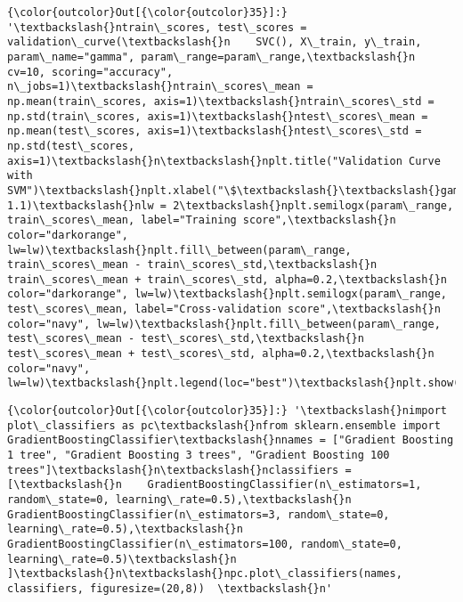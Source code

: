\documentclass[11pt]{article}
\begin{document}
\begin{Verbatim}[commandchars=\\\{\}]
{\color{outcolor}Out[{\color{outcolor}35}]:} '\textbackslash{}ntrain\_scores, test\_scores = validation\_curve(\textbackslash{}n    SVC(), X\_train, y\_train, param\_name="gamma", param\_range=param\_range,\textbackslash{}n    cv=10, scoring="accuracy", n\_jobs=1)\textbackslash{}ntrain\_scores\_mean = np.mean(train\_scores, axis=1)\textbackslash{}ntrain\_scores\_std = np.std(train\_scores, axis=1)\textbackslash{}ntest\_scores\_mean = np.mean(test\_scores, axis=1)\textbackslash{}ntest\_scores\_std = np.std(test\_scores, axis=1)\textbackslash{}n\textbackslash{}nplt.title("Validation Curve with SVM")\textbackslash{}nplt.xlabel("\$\textbackslash{}\textbackslash{}gamma\$")\textbackslash{}nplt.ylabel("Score")\textbackslash{}nplt.ylim(0.0, 1.1)\textbackslash{}nlw = 2\textbackslash{}nplt.semilogx(param\_range, train\_scores\_mean, label="Training score",\textbackslash{}n             color="darkorange", lw=lw)\textbackslash{}nplt.fill\_between(param\_range, train\_scores\_mean - train\_scores\_std,\textbackslash{}n                 train\_scores\_mean + train\_scores\_std, alpha=0.2,\textbackslash{}n                 color="darkorange", lw=lw)\textbackslash{}nplt.semilogx(param\_range, test\_scores\_mean, label="Cross-validation score",\textbackslash{}n             color="navy", lw=lw)\textbackslash{}nplt.fill\_between(param\_range, test\_scores\_mean - test\_scores\_std,\textbackslash{}n                 test\_scores\_mean + test\_scores\_std, alpha=0.2,\textbackslash{}n                 color="navy", lw=lw)\textbackslash{}nplt.legend(loc="best")\textbackslash{}nplt.show()\textbackslash{}n'
\end{Verbatim}
            
\begin{Verbatim}[commandchars=\\\{\}]
{\color{outcolor}Out[{\color{outcolor}35}]:} '\textbackslash{}nimport plot\_classifiers as pc\textbackslash{}nfrom sklearn.ensemble import GradientBoostingClassifier\textbackslash{}nnames = ["Gradient Boosting 1 tree", "Gradient Boosting 3 trees", "Gradient Boosting 100 trees"]\textbackslash{}n\textbackslash{}nclassifiers = [\textbackslash{}n    GradientBoostingClassifier(n\_estimators=1, random\_state=0, learning\_rate=0.5),\textbackslash{}n    GradientBoostingClassifier(n\_estimators=3, random\_state=0, learning\_rate=0.5),\textbackslash{}n    GradientBoostingClassifier(n\_estimators=100, random\_state=0, learning\_rate=0.5)\textbackslash{}n    ]\textbackslash{}n\textbackslash{}npc.plot\_classifiers(names, classifiers, figuresize=(20,8))  \textbackslash{}n'
\end{Verbatim}
            
    \begin{center}
    \end{center}
    { \hspace*{\fill} \\}
    

    
    
    
    
\end{document}
